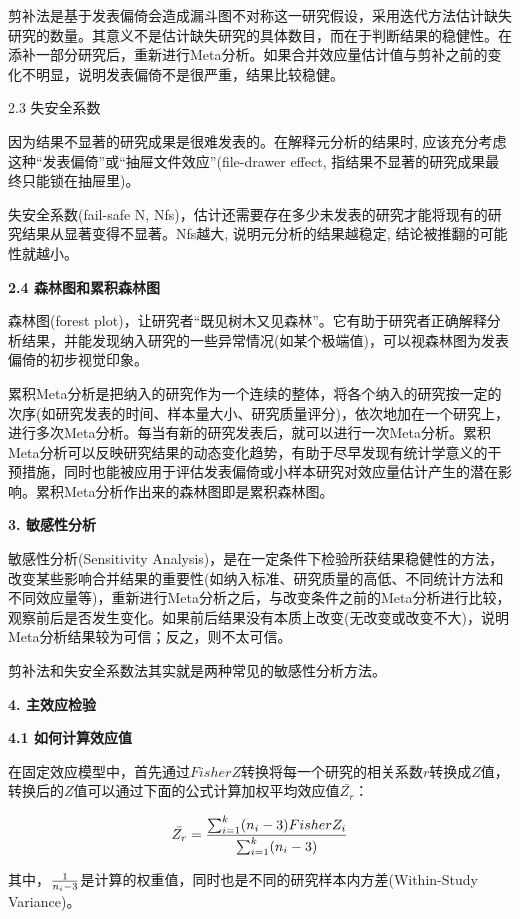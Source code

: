 \documentclass[
]{book}
\begin{document}
剪补法是基于发表偏倚会造成漏斗图不对称这一研究假设，采用迭代方法估计缺失研究的数量。其意义不是估计缺失研究的具体数目，而在于判断结果的稳健性。在添补一部分研究后，重新进行Meta分析。如果合并效应量估计值与剪补之前的变化不明显，说明发表偏倚不是很严重，结果比较稳健。

2.3 失安全系数

因为结果不显著的研究成果是很难发表的。在解释元分析的结果时, 应该充分考虑这种``发表偏倚''或``抽屉文件效应''(file-drawer effect, 指结果不显著的研究成果最终只能锁在抽屉里)。

失安全系数(fail-safe N, Nfs)，估计还需要存在多少未发表的研究才能将现有的研究结果从显著变得不显著。Nfs越大, 说明元分析的结果越稳定, 结论被推翻的可能性就越小。

\textbf{2.4 森林图和累积森林图}

森林图(forest plot)，让研究者``既见树木又见森林''。它有助于研究者正确解释分析结果，并能发现纳入研究的一些异常情况(如某个极端值)，可以视森林图为发表偏倚的初步视觉印象。

累积Meta分析是把纳入的研究作为一个连续的整体，将各个纳入的研究按一定的次序(如研究发表的时间、样本量大小、研究质量评分)，依次地加在一个研究上，进行多次Meta分析。每当有新的研究发表后，就可以进行一次Meta分析。累积Meta分析可以反映研究结果的动态变化趋势，有助于尽早发现有统计学意义的干预措施，同时也能被应用于评估发表偏倚或小样本研究对效应量估计产生的潜在影响。累积Meta分析作出来的森林图即是累积森林图。

\textbf{3. 敏感性分析}

敏感性分析(Sensitivity Analysis)，是在一定条件下检验所获结果稳健性的方法，改变某些影响合并结果的重要性(如纳入标准、研究质量的高低、不同统计方法和不同效应量等)，重新进行Meta分析之后，与改变条件之前的Meta分析进行比较，观察前后是否发生变化。如果前后结果没有本质上改变(无改变或改变不大)，说明Meta分析结果较为可信；反之，则不太可信\autocite{zhangyi2009:RNG}。

剪补法和失安全系数法其实就是两种常见的敏感性分析方法。

\textbf{4. 主效应检验}

\textbf{4.1 如何计算效应值}

在固定效应模型中，首先通过\(FisherZ\)转换将每一个研究的相关系数\(r\)转换成\(Z\)值，转换后的\(Z\)值可以通过下面的公式计算加权平均效应值\(\bar{Z_{r}}\)：

\[
\bar{Z_{r}}={{\sum_{i=1}^{k}(n_{i}-3)FisherZ_{i}}\over{\sum_{i=1}^{k}(n_{i}-3)}}
\]

其中，\({1}\over{n_{i}-3}\)是计算的权重值，同时也是不同的研究样本内方差(Within-Study Variance)。
\end{document}
